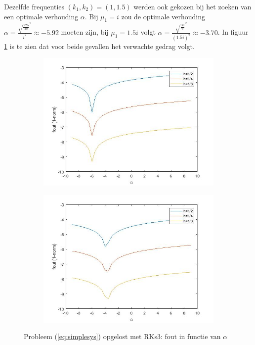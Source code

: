\documentclass[12pt]{article}
\begin{document}
Dezelfde frequenties \((k_1,k_2)=(1,1.5)\) werden ook gekozen bij het zoeken van een optimale verhouding \(\alpha\). Bij \(\mu_1=i\) zou de optimale verhouding \(\alpha=\frac{\sqrt{\frac{225}{38}}^2}{i^2}\approx-5.92\) moeten zijn,  bij \(\mu_1=1.5i\) volgt \(\alpha=\frac{\sqrt{\frac{50}{6}}^2}{(1.5i)^2}\approx-3.70\). In figuur \ref{fig:simplealphasrks3} is te zien dat voor beide gevallen het verwachte gedrag volgt.
\begin{figure}[H]
    \centering
    \begin{subfigure}{0.49\textwidth}
        \includegraphics[width=\textwidth]{simple_i_RKs3.jpg}
    \end{subfigure}
    \begin{subfigure}{0.49\textwidth}
        \includegraphics[width=\textwidth]{simple_2i_RKs3.jpg}
    \end{subfigure}
    \caption{Probleem (\ref{eq:simplesys}) opgelost met RKs3: fout in functie van \(\alpha\)}
    \label{fig:simplealphasrks3}
\end{figure}
\end{document}
